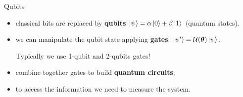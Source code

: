 \documentclass[8pt, xcolor={svgnames}, hyperref={linkcolor=black}]{beamer}
\begin{document}
\begin{frame}{Qubits}
        \begin{itemize}[noitemsep]
           \item<1,2,3,4>[1.] classical bits are replaced by \textbf{qubits}
           $ \ket{\psi} = \alpha\ket{0}+\beta\ket{1}$ (quantum states).
           \item<2,3,4>[2.] we can manipulate the qubit state applying \textbf{gates}: $\ket{\psi'}=\mathcal{U}(\bm{\theta})\ket{\psi}.$

           Typically we use 1-qubit and 2-qubits gates!
           \item<3,4>[3.] combine together gates to build \textbf{quantum circuits};
           \item<4>[4.] to access the information we need to measure the system.
        \end{itemize}
        \begin{figure}

\end{figure}
\end{frame}
\end{document}
